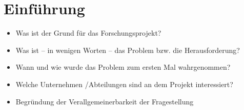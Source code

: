 \section{Einf\"{u}hrung}
\label{sec:Einfuehrung}
\begin{itemize}
  \item Was ist der Grund für das Forschungsprojekt?
  \item Was ist – in wenigen Worten – das Problem bzw. die Herausforderung? 
  \item Wann und wie wurde das Problem zum ersten Mal  wahrgenommen?
  \item Welche Unternehmen /Abteilungen sind an dem Projekt interessiert?
  \item Begründung der Verallgemeinerbarkeit der Fragestellung
\end{itemize}
